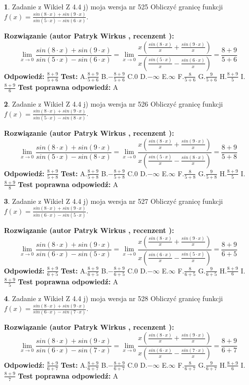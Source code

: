 \documentclass[12pt, a4paper]{article}
\theoremstyle{definition} %
\newtheorem{zad}{}
\newcommand{\zadStart}[1]{\begin{zad}#1\newline}
\newcommand{\zadStop}{\end{zad}}
\newcommand{\rozwStart}[2]{\noindent \textbf{Rozwiązanie (autor #1 , recenzent #2): }\newline}
\newcommand{\rozwStop}{\newline}
\newcommand{\odpStart}{\noindent \textbf{Odpowiedź:}\newline}
\newcommand{\odpStop}{\newline}
\newcommand{\testStart}{\noindent \textbf{Test:}\newline}
\newcommand{\testStop}{\newline}
\newcommand{\kluczStart}{\noindent \textbf{Test poprawna odpowiedź:}\newline}
\newcommand{\kluczStop}{\newline}
\begin{document}
\zadStart{Zadanie z Wikieł Z 4.4 j) moja wersja nr 525}
Obliczyć granicę funkcji $f(x)=\frac{sin(8\cdot x) +sin(9\cdot x)}{sin(5\cdot x) -sin(6\cdot x)}$.
\zadStop
\rozwStart{Patryk Wirkus}{}
$$\lim\limits_{x\to 0}\frac{sin(8\cdot x) +sin(9\cdot x)}{sin(5\cdot x) -sin(6\cdot x)}=\lim\limits_{x\to 0}\frac{x(\frac{sin(8\cdot x)}{x}+\frac{sin(9\cdot x)}{x})}{x(\frac{sin(5\cdot x)}{x}-\frac{sin(6\cdot x)}{x})}=\frac{8+9}{5+6}$$
\rozwStop
\odpStart
$\frac{8+9}{5+6}$
\odpStop
\testStart
A.$\frac{8+9}{5+6}$
B.$-\frac{8+9}{5+6}$
C.$0$
D.$-\infty$
E.$\infty$
F.$\frac{8}{5+6}$
G.$\frac{9}{5+6}$
H.$\frac{8+9}{5}$
I.$\frac{8+9}{6}$
\testStop
\kluczStart
A
\kluczStop



\zadStart{Zadanie z Wikieł Z 4.4 j) moja wersja nr 526}
Obliczyć granicę funkcji $f(x)=\frac{sin(8\cdot x) +sin(9\cdot x)}{sin(5\cdot x) -sin(8\cdot x)}$.
\zadStop
\rozwStart{Patryk Wirkus}{}
$$\lim\limits_{x\to 0}\frac{sin(8\cdot x) +sin(9\cdot x)}{sin(5\cdot x) -sin(8\cdot x)}=\lim\limits_{x\to 0}\frac{x(\frac{sin(8\cdot x)}{x}+\frac{sin(9\cdot x)}{x})}{x(\frac{sin(5\cdot x)}{x}-\frac{sin(8\cdot x)}{x})}=\frac{8+9}{5+8}$$
\rozwStop
\odpStart
$\frac{8+9}{5+8}$
\odpStop
\testStart
A.$\frac{8+9}{5+8}$
B.$-\frac{8+9}{5+8}$
C.$0$
D.$-\infty$
E.$\infty$
F.$\frac{8}{5+8}$
G.$\frac{9}{5+8}$
H.$\frac{8+9}{5}$
I.$\frac{8+9}{8}$
\testStop
\kluczStart
A
\kluczStop



\zadStart{Zadanie z Wikieł Z 4.4 j) moja wersja nr 527}
Obliczyć granicę funkcji $f(x)=\frac{sin(8\cdot x) +sin(9\cdot x)}{sin(6\cdot x) -sin(5\cdot x)}$.
\zadStop
\rozwStart{Patryk Wirkus}{}
$$\lim\limits_{x\to 0}\frac{sin(8\cdot x) +sin(9\cdot x)}{sin(6\cdot x) -sin(5\cdot x)}=\lim\limits_{x\to 0}\frac{x(\frac{sin(8\cdot x)}{x}+\frac{sin(9\cdot x)}{x})}{x(\frac{sin(6\cdot x)}{x}-\frac{sin(5\cdot x)}{x})}=\frac{8+9}{6+5}$$
\rozwStop
\odpStart
$\frac{8+9}{6+5}$
\odpStop
\testStart
A.$\frac{8+9}{6+5}$
B.$-\frac{8+9}{6+5}$
C.$0$
D.$-\infty$
E.$\infty$
F.$\frac{8}{6+5}$
G.$\frac{9}{6+5}$
H.$\frac{8+9}{6}$
I.$\frac{8+9}{5}$
\testStop
\kluczStart
A
\kluczStop



\zadStart{Zadanie z Wikieł Z 4.4 j) moja wersja nr 528}
Obliczyć granicę funkcji $f(x)=\frac{sin(8\cdot x) +sin(9\cdot x)}{sin(6\cdot x) -sin(7\cdot x)}$.
\zadStop
\rozwStart{Patryk Wirkus}{}
$$\lim\limits_{x\to 0}\frac{sin(8\cdot x) +sin(9\cdot x)}{sin(6\cdot x) -sin(7\cdot x)}=\lim\limits_{x\to 0}\frac{x(\frac{sin(8\cdot x)}{x}+\frac{sin(9\cdot x)}{x})}{x(\frac{sin(6\cdot x)}{x}-\frac{sin(7\cdot x)}{x})}=\frac{8+9}{6+7}$$
\rozwStop
\odpStart
$\frac{8+9}{6+7}$
\odpStop
\testStart
A.$\frac{8+9}{6+7}$
B.$-\frac{8+9}{6+7}$
C.$0$
D.$-\infty$
E.$\infty$
F.$\frac{8}{6+7}$
G.$\frac{9}{6+7}$
H.$\frac{8+9}{6}$
I.$\frac{8+9}{7}$
\testStop
\kluczStart
A
\kluczStop
\end{document}
